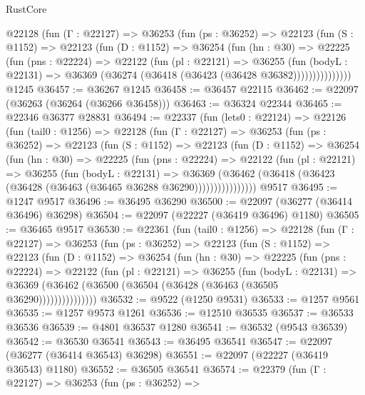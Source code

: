 \begin{lexlean}{RustCore}
\begin{coremodule}
        @22128
          (fun (Γ : @22127) =>
          @36253
            (fun (ps : @36252) =>
            @22123
              (fun (S : @1152) =>
              @22123
                (fun (D : @1152) =>
                @36254
                  (fun (hn : @30) =>
                  @22225
                    (fun (pns : @22224) =>
                    @22122
                      (fun (pl : @22121) =>
                      @36255
                        (fun (bodyL : @22131) =>
                        @36369 (@36274 (@36418 (@36423 (@36428 @36382)))))))))))))))
    @1245
@36457 := @36267 @1245
@36458 := @36457 @22115
@36462 := @22097 (@36263 (@36264 (@36266 @36458)))
@36463 := @36324 @22344
@36465 := @22346 @36377 @28831
@36494 := @22337
    (fun (lets0 : @22124) =>
    @22126
      (fun (tail0 : @1256) =>
      @22128
        (fun (Γ : @22127) =>
        @36253
          (fun (ps : @36252) =>
          @22123
            (fun (S : @1152) =>
            @22123
              (fun (D : @1152) =>
              @36254
                (fun (hn : @30) =>
                @22225
                  (fun (pns : @22224) =>
                  @22122
                    (fun (pl : @22121) =>
                    @36255
                      (fun (bodyL : @22131) =>
                      @36369
                        (@36462
                          (@36418 (@36423 (@36428 (@36463 (@36465 @36288 @36290))))))))))))))))
    @9517
@36495 := @1247 @9517
@36496 := @36495 @36290
@36500 := @22097 (@36277 (@36414 @36496) @36298)
@36504 := @22097 (@22227 (@36419 @36496) @1180)
@36505 := @36465 @9517
@36530 := @22361
    (fun (tail0 : @1256) =>
    @22128
      (fun (Γ : @22127) =>
      @36253
        (fun (ps : @36252) =>
        @22123
          (fun (S : @1152) =>
          @22123
            (fun (D : @1152) =>
            @36254
              (fun (hn : @30) =>
              @22225
                (fun (pns : @22224) =>
                @22122
                  (fun (pl : @22121) =>
                  @36255
                    (fun (bodyL : @22131) =>
                    @36369 (@36462 (@36500 (@36504 (@36428 (@36463 (@36505 @36290)))))))))))))))
@36532 := @9522 (@1250 @9531)
@36533 := @1257 @9561
@36535 := @1257 @9573 @1261
@36536 := @12510 @36535
@36537 := @36533 @36536
@36539 := @4801 @36537 @1280
@36541 := @36532 (@9543 @36539)
@36542 := @36530 @36541
@36543 := @36495 @36541
@36547 := @22097 (@36277 (@36414 @36543) @36298)
@36551 := @22097 (@22227 (@36419 @36543) @1180)
@36552 := @36505 @36541
@36574 := @22379
    (fun (Γ : @22127) =>
    @36253
      (fun (ps : @36252) =>

\end{coremodule}
\end{lexlean}
